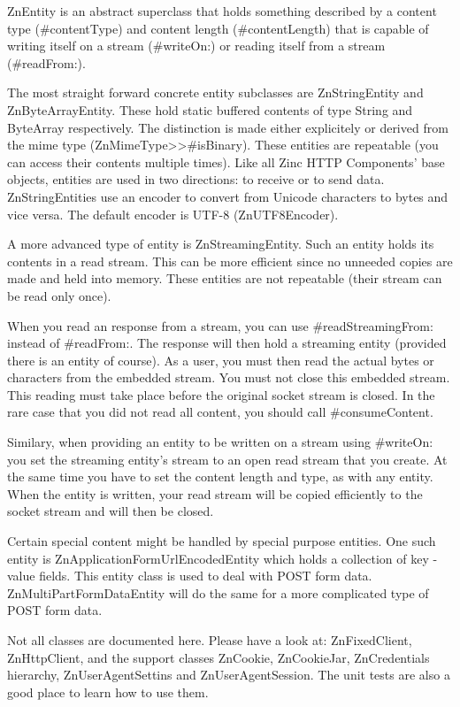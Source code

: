 \documentclass[a4paper,10pt,twoside]{book}
\begin{document}
ZnEntity is an abstract superclass that holds something described by a content type (#contentType) and content length (#contentLength) that is capable of writing itself on a stream (#writeOn:) or reading itself from a stream (#readFrom:).

The most straight forward concrete entity subclasses are ZnStringEntity and ZnByteArrayEntity. These hold static buffered contents of type String and ByteArray respectively. The distinction is made either explicitely or derived from the mime type (ZnMimeType>>#isBinary). These entities are repeatable (you can access their contents multiple times). Like all Zinc HTTP Components' base objects, entities are used in two directions: to receive or to send data. ZnStringEntities use an encoder to convert from Unicode characters to bytes and vice versa. The default encoder is UTF-8 (ZnUTF8Encoder).

A more advanced type of entity is ZnStreamingEntity. Such an entity holds its contents in a read stream. This can be more efficient since no unneeded copies are made and held into memory. These entities are not repeatable (their stream can be read only once).

When you read an response from a stream, you can use #readStreamingFrom: instead of #readFrom:. The response will then hold a streaming entity (provided there is an entity of course). As a user, you must then read the actual bytes or characters from the embedded stream. You must not close this embedded stream. This reading must take place before the original socket stream is closed. In the rare case that you did not read all content, you should call #consumeContent.

Similary, when providing an entity to be written on a stream using #writeOn: you set the streaming entity's stream to an open read stream that you create. At the same time you have to set the content length and type, as with any entity. When the entity is written, your read stream will be copied efficiently to the socket stream and will then be closed.

Certain special content might be handled by special purpose entities. One such entity is ZnApplicationFormUrlEncodedEntity which holds a collection of key - value fields. This entity class is used to deal with POST form data. ZnMultiPartFormDataEntity will do the same for a more complicated type of POST form data.

Not all classes are documented here. Please have a look at: ZnFixedClient, ZnHttpClient, and the support classes ZnCookie, ZnCookieJar, ZnCredentials hierarchy, ZnUserAgentSettins and ZnUserAgentSession. The unit tests are also a good place to learn how to use them.
\end{document}
